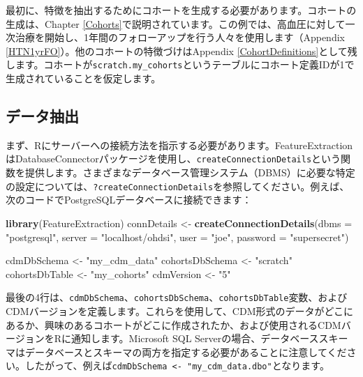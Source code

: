 \documentclass[
  11pt]{book}
\newenvironment{Shaded}{\begin{snugshade}}{\end{snugshade}}
\newcommand{\AttributeTok}[1]{\textcolor[rgb]{0.13,0.29,0.53}{#1}}
\newcommand{\FunctionTok}[1]{\textcolor[rgb]{0.13,0.29,0.53}{\textbf{#1}}}
\newcommand{\NormalTok}[1]{#1}
\newcommand{\OtherTok}[1]{\textcolor[rgb]{0.56,0.35,0.01}{#1}}
\newcommand{\StringTok}[1]{\textcolor[rgb]{0.31,0.60,0.02}{#1}}
\theoremstyle{definition}
\theoremstyle{definition}
\theoremstyle{definition}
\theoremstyle{definition}
\theoremstyle{remark}
\begin{document}
最初に、特徴を抽出するためにコホートを生成する必要があります。コホートの生成は、Chapter \ref{Cohorts}で説明されています。この例では、高血圧に対して一次治療を開始し、1年間のフォローアップを行う人々を使用します（Appendix \ref{HTN1yrFO}）。他のコホートの特徴づけはAppendix \ref{CohortDefinitions}として残します。コホートが\texttt{scratch.my\_cohorts}というテーブルにコホート定義IDが1で生成されていることを仮定します。

\subsection{データ抽出}\label{ux30c7ux30fcux30bfux62bdux51fa}

まず、Rにサーバーへの接続方法を指示する必要があります。FeatureExtractionはDatabaseConnectorパッケージを使用し、\texttt{createConnectionDetails}という関数を提供します。さまざまなデータベース管理システム（DBMS）に必要な特定の設定については、\texttt{?createConnectionDetails}を参照してください。例えば、次のコードでPostgreSQLデータベースに接続できます：

\begin{Shaded}
\begin{Highlighting}[]
\FunctionTok{library}\NormalTok{(FeatureExtraction)}
\NormalTok{connDetails }\OtherTok{\textless{}{-}} \FunctionTok{createConnectionDetails}\NormalTok{(}\AttributeTok{dbms =} \StringTok{"postgresql"}\NormalTok{,}
                                       \AttributeTok{server =} \StringTok{"localhost/ohdsi"}\NormalTok{,}
                                       \AttributeTok{user =} \StringTok{"joe"}\NormalTok{,}
                                       \AttributeTok{password =} \StringTok{"supersecret"}\NormalTok{)}

\NormalTok{cdmDbSchema }\OtherTok{\textless{}{-}} \StringTok{"my\_cdm\_data"}
\NormalTok{cohortsDbSchema }\OtherTok{\textless{}{-}} \StringTok{"scratch"}
\NormalTok{cohortsDbTable }\OtherTok{\textless{}{-}} \StringTok{"my\_cohorts"}
\NormalTok{cdmVersion }\OtherTok{\textless{}{-}} \StringTok{"5"}
\end{Highlighting}
\end{Shaded}

最後の4行は、\texttt{cdmDbSchema}、\texttt{cohortsDbSchema}、\texttt{cohortsDbTable}変数、およびCDMバージョンを定義します。これらを使用して、CDM形式のデータがどこにあるか、興味のあるコホートがどこに作成されたか、および使用されるCDMバージョンをRに通知します。Microsoft SQL Serverの場合、データベーススキーマはデータベースとスキーマの両方を指定する必要があることに注意してください。したがって、例えば\texttt{cdmDbSchema\ \textless{}-\ "my\_cdm\_data.dbo"}となります。
\end{document}
